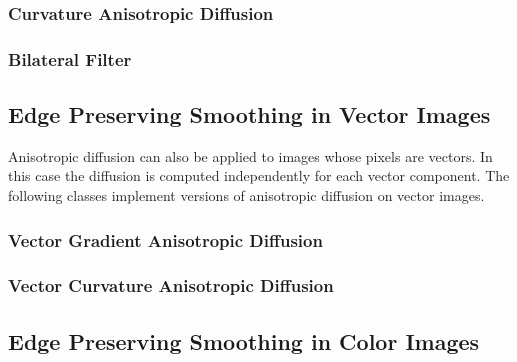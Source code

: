 



\subsubsection{Curvature Anisotropic Diffusion}
\label{sec:CurvatureAnisotropicDiffusionImageFilter}




\subsubsection{Bilateral Filter}
\label{sec:BilateralImageFilter}





\subsection{Edge Preserving Smoothing in Vector Images}
\label{sec:VectorAnisotropicDiffusion}

Anisotropic diffusion can also be applied to images whose pixels are vectors.
In this case the diffusion is computed independently for each vector component.
The following classes implement versions of anisotropic diffusion on vector images.


\subsubsection{Vector Gradient Anisotropic Diffusion}
\label{sec:VectorGradientAnisotropicDiffusionImageFilter}



\subsubsection{Vector Curvature Anisotropic Diffusion}
\label{sec:VectorCurvatureAnisotropicDiffusionImageFilter}





\subsection{Edge Preserving Smoothing in Color Images}
\label{sec:ColorAnisotropicDiffusion}

